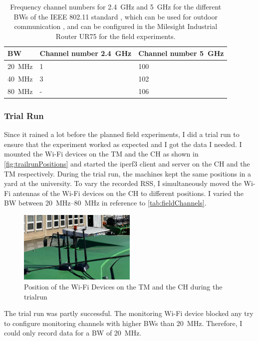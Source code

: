 \begin{table}[H]
	\centering
	\begin{tabular}{>{\centering}p{2cm}p{4cm}p{4cm}}
		\toprule
		\ac{BW} & Channel number \SI{2.4}{\giga\hertz} & Channel number \SI{5}{\giga\hertz}\\
		\midrule
		\SI{20}{\mega\hertz} & \num{1}&
		\num{100} \\
		\SI{40}{\mega\hertz} &
		\num{3}
		& \num{102} \\
		\SI{80}{\mega\hertz} &
		- & \num{106} \\
		\bottomrule
	\end{tabular}
	\caption{Frequency channel numbers for \SI{2.4}{\giga\hertz} and \SI{5}{\giga\hertz} for the different \acf{BW}s of the IEEE 802.11 standard \cite{ieee_standard_2021ax}, which can be used for
	outdoor communication \cite{freq_plan_24G}, \cite{freq_plan_5G} and can be configured in the Milesight Industrial Router UR75 for
	the field experiments.}
	\label{tab:fieldChannels}
\end{table}

\subsubsection*{Trial Run}

Since it rained a lot before the planned field experiments, I did a trial run to ensure that the experiment worked as expected and I got the data I needed.
I mounted the Wi-Fi devices on the \ac{TM} and the \ac{CH} as shown in \autoref{fig:trailrunPositions} and
started the iperf3 client and server on the \ac{CH} and the \ac{TM} respectively.
During the trial run, the machines kept the same positions in a yard at the university.
To vary the recorded \ac{RSS}, I simultaneously moved the Wi-Fi antennas of the Wi-Fi devices on the \ac{CH} to
different positions.
I varied the \ac{BW} between \SIrange{20}{80}{\mega\hertz} in reference to \autoref{tab:fieldChannels}.
\begin{figure}[]%
   \centering
   \includegraphics[width=0.5\textwidth]{figures/trainRun}
   \caption{Position of the Wi-Fi Devices on the \ac{TM} and the \ac{CH} during the trialrun}
   \label{fig:trailrunPositions}%
\end{figure}
The trial run was partly successful.
The monitoring Wi-Fi device blocked any try to configure monitoring channels with higher \ac{BW}s than \SI{20}{\mega\hertz}.
Therefore, I could only record data for a \ac{BW} of \SI{20}{\mega\hertz}.

